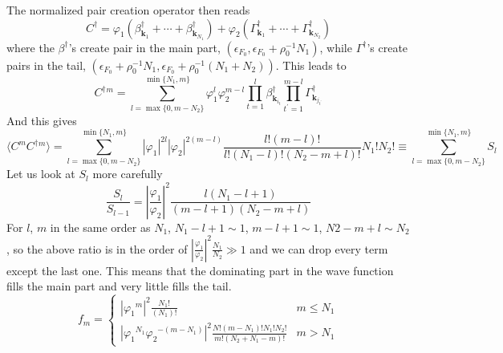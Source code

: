 \documentclass[aps,prb,preprint,groupedaddress,amsmath]{revtex4-1}
\newcommand{\vk}{\ensuremath{\mathbf{k}}}
\newcommand{\dg}{\ensuremath{\dagger}}
\begin{document}
The normalized pair creation operator then reads
\begin{equation}
C^\dg=\varphi_1(\beta^\dg_{\vk_1}+\cdots+\beta^\dg_{\vk_{N_1}})+\varphi_2(\Gamma^\dg_{\vk_{1}}+\cdots+\Gamma^\dg_{\vk_{N_2}})
\end{equation}
where the $\beta^\dg$'s create pair in the main part, $(\epsilon_{F_0},\epsilon_{F_0}+\rho_0^{-1}N_1)$, while $\Gamma^\dg$'s create pairs in the tail, $(\epsilon_{F_0}+\rho_0^{-1}N_1,\epsilon_{F_0}+\rho_0^{-1}(N_1+N_2))$.
This leads to\begin{equation}
C^\dg{}^m=\sum_{l=\max\{0,m-N_2\}}^{\min\{N_1,m\}}\varphi_1^l\varphi_2^{m-l}\prod_{t=1}^{l}\beta^\dg_{\vk_{i_t}}\prod_{t^\prime=1}^{m-l}\Gamma^\dg_{\vk_{j_{t^\prime}}}
\end{equation}
And this gives
\begin{equation}
\langle{}C^mC^\dg{}^m\rangle=\sum_{l=\max\{0,m-N_2\}}^{\min\{N_1,m\}}|\varphi_1|^{2l}|\varphi_2|^{2(m-l)}
\frac{l!(m-l)!}{l!(N_1-l)!(N_2-m+l)!}N_1!N_2!\equiv\sum_{l=\max\{0,m-N_2\}}^{\min\{N_1,m\}}S_l
\end{equation}
Let us look at $S_l$ more carefully
\begin{equation}
\frac{S_l}{S_{l-1}}=\left|\frac{\varphi_1}{\varphi_2}\right|^2\frac{l(N_1-l+1)}{(m-l+1)(N_2-m+l)}
\end{equation}
For $l$, $m$ in the same order as $N_1$, $N_1-l+1\sim1$, $m-l+1\sim1$, $N2-m+l\sim{N_2}$, so the above ratio is in the order of $\left|\frac{\varphi_1}{\varphi_2}\right|^2\frac{N_1}{N_2}\gg1$ and we can drop every term except the last one. This means that the dominating part in the wave function fills the main part and very little fills the tail.  
\begin{equation}
f_m=
\begin{cases}
\left|{\varphi_1}^{m}\right|^2\frac{N_1!}{(N_1)!}&m\leq{}N_1\\
\left|{\varphi_1}^{N_1}{\varphi_2}^{-(m-N_1)}\right|^2\frac{N!(m-N_1)!N_1!N_2!}{m!(N_2+N_1-m)!}&m>N_1
\end{cases}
\end{equation}
\end{document}
